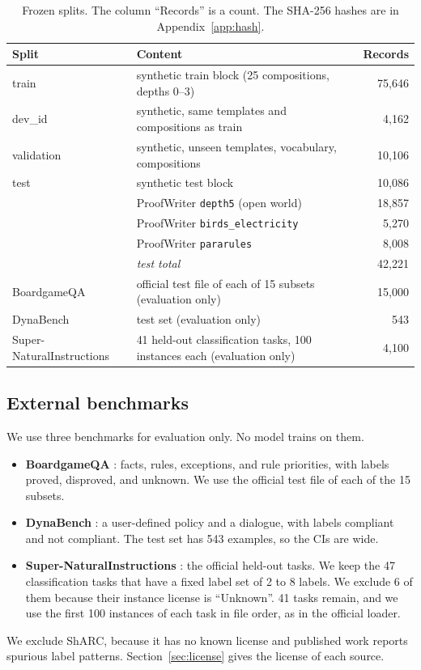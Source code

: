 \documentclass[11pt,a4paper]{article}
\begin{document}
\begin{table}[t]
\centering
\caption{Frozen splits. The column ``Records'' is a count. The SHA-256 hashes are in Appendix~\ref{app:hash}.}\label{tab:splits}
\small
\begin{tabular}{lp{8.4cm}r}
\toprule
Split & Content & Records \\
\midrule
train & synthetic train block (25 compositions, depths 0--3) & 75{,}646 \\
dev\_id & synthetic, same templates and compositions as train & 4{,}162 \\
validation & synthetic, unseen templates, vocabulary, compositions & 10{,}106 \\
test & synthetic test block & 10{,}086 \\
 & ProofWriter \texttt{depth5} (open world) & 18{,}857 \\
 & ProofWriter \texttt{birds\_electricity} & 5{,}270 \\
 & ProofWriter \texttt{pararules} & 8{,}008 \\
 & \emph{test total} & 42{,}221 \\
\midrule
BoardgameQA & official test file of each of 15 subsets (evaluation only) & 15{,}000 \\
DynaBench & test set (evaluation only) & 543 \\
Super-NaturalInstructions & 41 held-out classification tasks, 100 instances each (evaluation only) & 4{,}100 \\
\bottomrule
\end{tabular}
\end{table}

\subsection{External benchmarks}

We use three benchmarks for evaluation only.
No model trains on them.
\begin{itemize}
  \item \textbf{BoardgameQA} \cite{kazemi2023}: facts, rules, exceptions, and rule priorities, with labels proved, disproved, and unknown. We use the official test file of each of the 15 subsets.
  \item \textbf{DynaBench} \cite{hoover2025}: a user-defined policy and a dialogue, with labels compliant and not compliant. The test set has 543 examples, so the CIs are wide.
  \item \textbf{Super-NaturalInstructions} \cite{wang2022}: the official held-out tasks. We keep the 47 classification tasks that have a fixed label set of 2 to 8 labels. We exclude 6 of them because their instance license is ``Unknown''. 41 tasks remain, and we use the first 100 instances of each task in file order, as in the official loader.
\end{itemize}
We exclude ShARC, because it has no known license and published work reports spurious label patterns.
Section~\ref{sec:license} gives the license of each source.
\end{document}
